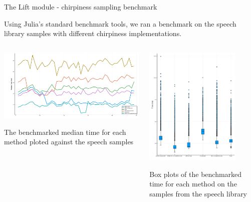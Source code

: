 \documentclass[10pt,american,ignorenonframetext,aspectratio=1610]{beamer}
\theoremstyle{remark}
\begin{document}
\begin{frame}{The Lift module - chirpiness sampling benchmark}
\protect\hypertarget{the-lift-module---chirpiness-sampling-benchmark}{}

Using Julia's standard benchmark tools, we ran a benchmark on the speech
library samples with different chirpiness implementations.

\begin{columns}[T]
\begin{column}{0.6\textwidth}
\includegraphics[width=1\textwidth,height=\textheight]{img/benchmark_median_time.png}

The benchmarked median time for each method ploted against the speech
samples
\end{column}

\begin{column}{0.4\textwidth}
\includegraphics[width=0.8\textwidth,height=\textheight]{img/benchmark_time_boxplot.png}

Box plots of the benchmarked time for each method on the samples from
the speech library
\end{column}
\end{columns}

\end{frame}
\end{document}
